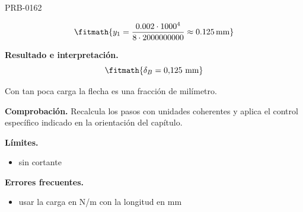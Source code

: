 \begin{studiumworked}{PRB-0162}
\begin{enumerate}
\[\fitmath{y_{1}=\frac{0.002\cdot {1000}^{4}}{8\cdot 2000000000}\approx 0.125\,\mathrm{mm}}\]

\end{enumerate}

\textbf{Resultado e interpretación.}\[\fitmath{\delta_B = 0{,}125\ \mathrm{mm}}\]

Con tan poca carga la flecha es una fracción de milímetro.

\par\textbf{Comprobación.} Recalcula los pasos con unidades coherentes y aplica el control específico indicado en la orientación del capítulo.

\textbf{Límites.}\begin{itemize}\item sin cortante\end{itemize}

\textbf{Errores frecuentes.}\begin{itemize}\item usar la carga en N/m con la longitud en mm\end{itemize}

\end{studiumworked}

\Needspace{.3\textheight}

